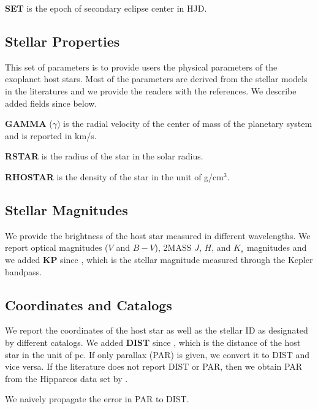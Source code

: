 \documentclass[11pt,preprint]{aastex}
\begin{document}
\begin{CJK*}{UTF8}{gbsn}
{\bf SET} is the epoch of secondary eclipse center in HJD.

\subsection{Stellar Properties}\label{sec:stellarprop}

This set of parameters is to provide users the physical parameters of
the exoplanet host stars.  Most of the parameters are derived from the
stellar models in the literatures and we provide the readers with the
references. We describe added fields since \cite{Wright2011} below.

{\bf GAMMA} ($\gamma$) is the radial velocity of the center of mass of
the planetary system and is reported in km/s.

{\bf RSTAR} is the radius of the star in the solar radius.

{\bf RHOSTAR} is the density of the star in the unit of g/cm$^3$.

\subsection{Stellar Magnitudes}\label{sec:stellarmag}

We provide the brightness of the host star measured in different
wavelengths. We report optical magnitudes ($V$ and $B-V$), 2MASS $J$,
$H$, and $K_s$ magnitudes and we added {\bf KP} since
\cite{Wright2011}, which is the stellar magnitude measured through the
Kepler bandpass.


\subsection{Coordinates and Catalogs}\label{sec:coord}
We report the coordinates of the host star as well as the stellar ID
as designated by different catalogs.  We added {\bf DIST} since
\cite{Wright2011}, which is the distance of the host star in the unit
of pc. If only parallax (PAR) is given, we convert it to DIST and vice
versa. If the literature does not report DIST or PAR, then we obtain
PAR from the Hipparcos data set by \cite{van Leeuwen2009}.

We naively propagate the error in PAR to DIST. 


\end{CJK*}
\end{document}

